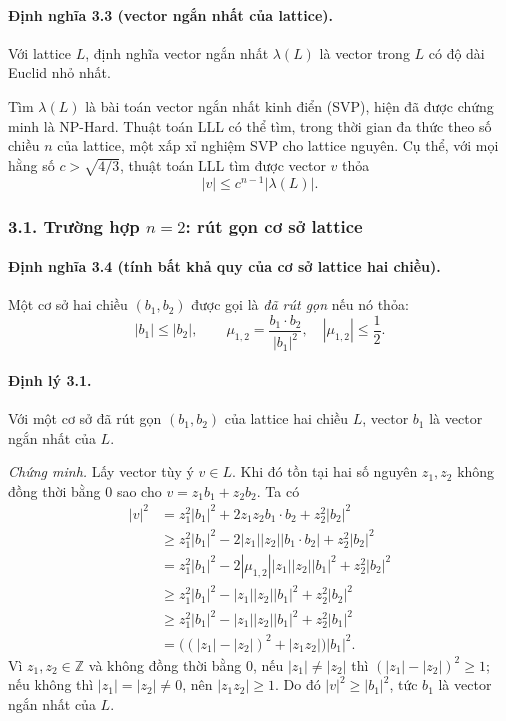 \documentclass[11pt]{article}
\begin{document}
\paragraph{Định nghĩa 3.3 (vector ngắn nhất của lattice).}
Với lattice \(L\), định nghĩa vector ngắn nhất \(\lambda(L)\) là vector trong
\(L\) có độ dài Euclid nhỏ nhất.

Tìm \(\lambda(L)\) là bài toán vector ngắn nhất kinh điển (SVP), hiện đã được
chứng minh là NP-Hard. Thuật toán LLL có thể tìm, trong thời gian đa thức theo
số chiều \(n\) của lattice, một xấp xỉ nghiệm SVP cho lattice nguyên. Cụ thể,
với mọi hằng số \(c>\sqrt{4/3}\), thuật toán LLL tìm được vector \(v\) thỏa
\[
  |v|\le c^{n-1}|\lambda(L)|.
\]

\subsubsection*{3.1. Trường hợp \(n=2\): rút gọn cơ sở lattice}

\paragraph{Định nghĩa 3.4 (tính bất khả quy của cơ sở lattice hai chiều).}
Một cơ sở hai chiều \((b_1,b_2)\) được gọi là \emph{đã rút gọn} nếu nó thỏa:
\[
  |b_1|\le |b_2|,\qquad
  \mu_{1,2}=\frac{b_1\cdot b_2}{|b_1|^2},\quad |\mu_{1,2}|\le \frac12.
\]

\paragraph{Định lý 3.1.}
Với một cơ sở đã rút gọn \((b_1,b_2)\) của lattice hai chiều \(L\), vector
\(b_1\) là vector ngắn nhất của \(L\).

\emph{Chứng minh.}
Lấy vector tùy ý \(v\in L\). Khi đó tồn tại hai số nguyên \(z_1,z_2\) không
đồng thời bằng \(0\) sao cho \(v=z_1b_1+z_2b_2\). Ta có
\[
\begin{aligned}
|v|^2
  &=z_1^2|b_1|^2+2z_1z_2b_1\cdot b_2+z_2^2|b_2|^2\\
  &\ge z_1^2|b_1|^2-2|z_1||z_2||b_1\cdot b_2|+z_2^2|b_2|^2\\
  &=z_1^2|b_1|^2-2|\mu_{1,2}||z_1||z_2||b_1|^2+z_2^2|b_2|^2\\
  &\ge z_1^2|b_1|^2-|z_1||z_2||b_1|^2+z_2^2|b_2|^2\\
  &\ge z_1^2|b_1|^2-|z_1||z_2||b_1|^2+z_2^2|b_1|^2\\
  &=\bigl((|z_1|-|z_2|)^2+|z_1z_2|\bigr)|b_1|^2.
\end{aligned}
\]
Vì \(z_1,z_2\in\mathbb Z\) và không đồng thời bằng \(0\), nếu
\(|z_1|\ne |z_2|\) thì \((|z_1|-|z_2|)^2\ge1\); nếu không thì
\(|z_1|=|z_2|\ne0\), nên \(|z_1z_2|\ge1\). Do đó \(|v|^2\ge |b_1|^2\), tức
\(b_1\) là vector ngắn nhất của \(L\).
\end{document}
